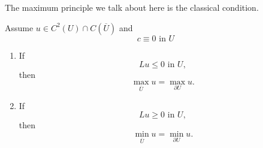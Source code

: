 The maximum principle we talk about here is the classical condition.
\begin{theorem}
  Assume $u\in C^2(U)\cap C(\overline{U})$ and
  \[
    c\equiv 0 \text{ in } U 
  \] 
  \begin{enumerate}
    \item If 
      \begin{equation}
	Lu\le 0 \text{ in }U,\label{3}
    \end{equation}
      then 
      \[
      \max_{\overline{U}}u=\max_{\partial U}u.
      \] 
    \item If 
      \begin{equation}
      Lu\ge 0 \text{ in }U,
    \end{equation}
      then 
      \[
      \min_{\overline{U}}u=\min_{\partial U}u.
      \] 
  \end{enumerate}\label{theorem1}
\end{theorem}
